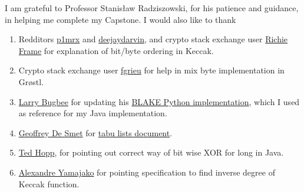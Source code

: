\documentclass[12pt,american]{report}
\theoremstyle{plain}
\theoremstyle{definition}
\begin{document}
\beforepreface%


%
\vfill
I am grateful to Professor Stanis{\l}aw Radziszowski, for his patience and guidance, in helping me
complete my Capstone. \newline \newline
I would also like to thank 
\begin{enumerate}
\item Redditors \href{"http://www.reddit.com/user/p1mrx"}{p1mrx} and 
\href{"http://www.reddit.com/user/deejaydarvin"}{deejaydarvin}, and crypto stack exchange user 
\href{"http://crypto.stackexchange.com/users/8050/richie-frame"}{Richie Frame} for explanation of bit/byte 
ordering in Keccak.
\item Crypto stack exchange user \href{"http://crypto.stackexchange.com/users/555/fgrieu"}{fgrieu} for help
in mix byte implementation in Gr{\o}stl.
\item \href{"http://www.seanet.com/~bugbee"}{Larry Bugbee} for updating his 
\href{http://www.seanet.com/~bugbee/crypto/blake/}{BLAKE Python implementation}, which I used as reference 
for my Java implementation.
\item \href{"http://stackoverflow.com/users/472109/geoffrey-de-smet"}{Geoffrey De Smet} for 
\href{"http://docs.jboss.org/drools/release/latest/optaplanner-docs/html\_single/index.html\#tabuSearch"}
{tabu lists document}.
\item \href{"http://stackoverflow.com/users/535871/ted-hopp"}{Ted Hopp}, for pointing out correct way
of bit wise XOR for long in Java.
\item \href{"http://crypto.stackexchange.com/users/4136/alexandre-yamajako"}{Alexandre Yamajako} for pointing
specification to find inverse degree of Keccak function.
\end{enumerate}
\vfill
\end{document}
